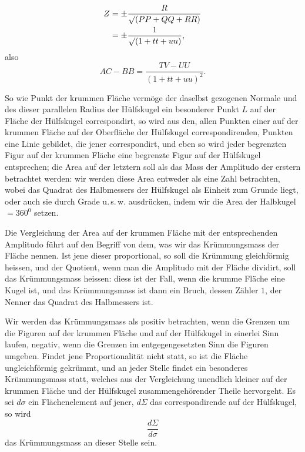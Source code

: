 %
\[
\begin{aligned}
Z&=\pm\frac{R}{\mathord{\surd}(PP+QQ+RR)}\\
&=\pm\frac{1}{\mathord{\surd}(1+tt+uu)},
\end{aligned}
\]
also
\[
AC-BB=\frac{TV-UU}{(1+tt+uu)^{2}}.
\]

So wie  Punkt der krummen Fläche vermöge der daselbst gezogenen Normale und des dieser parallelen Radius der Hülfskugel ein besonderer Punkt $L$ auf der Fläche der Hülfskugel correspondirt, so wird aus den, allen Punkten einer  auf der krummen Fläche auf der Oberfläche der Hülfskugel correspondirenden, Punkten eine Linie gebildet, die jener correspondirt, und eben so wird jeder begrenzten Figur auf der krummen Fläche eine begrenzte Figur auf der Hülfskugel entsprechen; die Area auf der letztern soll als das Mass der Amplitudo der erstern betrachtet werden: wir werden diese Area entweder als eine Zahl betrachten, wobei das Quadrat des Halbmessers der Hülfskugel als Einheit zum Grunde liegt, oder auch sie durch Grade u.\,s.\,w. ausdrücken, indem wir die Area der Halbkugel $=360^{0}$ setzen.

Die Vergleichung der Area auf der krummen Fläche mit der entsprechenden Amplitudo führt auf den Begriff von dem, was wir das Krümmungsmass der Fläche nennen. Ist jene dieser proportional, so soll die Krümmung gleichförmig heissen, und der Quotient, wenn man die Amplitudo mit der Fläche dividirt, soll das Krümmungsmass heissen: diess ist der Fall, wenn die krumme Fläche eine Kugel ist, und das Krümmungsmass ist dann ein Bruch, dessen Zähler $1$, der Nenner das Quadrat des Halbmessers ist.

Wir werden das Krümmungsmass als positiv betrachten, wenn die Grenzen um die Figuren auf der krummen Fläche und auf der Hülfskugel in einerlei Sinn laufen, negativ, wenn die Grenzen im entgegengesetzten Sinn die Figuren umgeben. Findet jene Proportionalität nicht statt, so ist die Fläche ungleichförmig gekrümmt, und an jeder Stelle findet ein besonderes Krümmungsmass statt, welches aus der Vergleichung unendlich kleiner auf der krummen Fläche und der Hülfskugel zusammengehörender Theile hervorgeht. Es sei $d\sigma$ ein Flächenelement auf jener, $d\Sigma$ das correspondirende auf der Hülfskugel, so wird
\[
\frac{d\Sigma}{d\sigma}
\]
das Krümmungsmass an dieser Stelle sein.
